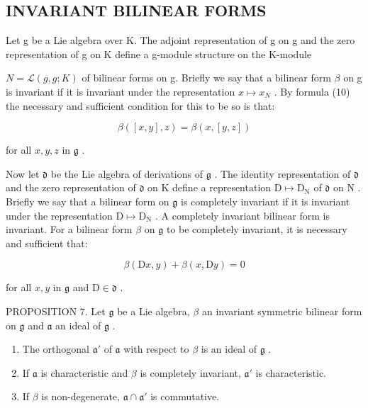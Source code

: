 \subsection{INVARIANT BILINEAR FORMS}

Let g be a Lie algebra over K. The adjoint representation of g on g and the zero representation of g on K define a g-module structure on the K-module

\(N = \mathcal{L}(g, g; K)\) of bilinear forms on g. Briefly we say that a bilinear form \(\beta\) on g is invariant if it is invariant under the representation \(x \mapsto x_{N}\) . By formula (10) the necessary and sufficient condition for this to be so is that:

\[
\beta ([ x, y ], z) = \beta (x, [ y, z ])\tag{13}
\]

for all \(x, y, z\) in \(\mathfrak{g}\) .

Now let \(\mathfrak{d}\) be the Lie algebra of derivations of \(\mathfrak{g}\) . The identity representation of \(\mathfrak{d}\) and the zero representation of \(\mathfrak{d}\) on \(\mathrm{K}\) define a representation \(\mathrm{D} \mapsto \mathrm{D}_{\mathrm{N}}\) of \(\mathfrak{d}\) on \(\mathrm{N}\) . Briefly we say that a bilinear form on \(\mathfrak{g}\) is completely invariant if it is invariant under the representation \(\mathrm{D} \mapsto \mathrm{D}_{\mathrm{N}}\) . A completely invariant bilinear form is invariant. For a bilinear form \(\beta\) on \(\mathfrak{g}\) to be completely invariant, it is necessary and sufficient that:

\[
\beta (\mathrm{D} x, y) + \beta (x, \mathrm{D} y) = 0\tag{14}
\]

for all \(x, y\) in \(\mathfrak{g}\) and \(\mathrm{D} \in \mathfrak{d}\) .

PROPOSITION 7. Let \(\mathfrak{g}\) be a Lie algebra, \(\beta\) an invariant symmetric bilinear form on \(\mathfrak{g}\) and \(\mathfrak{a}\) an ideal of \(\mathfrak{g}\) .

\begin{enumerate}
\def\labelenumi{(\alph{enumi})}
\item
  The orthogonal \(\mathfrak{a}'\) of \(\mathfrak{a}\) with respect to \(\beta\) is an ideal of \(\mathfrak{g}\) .
\item
  If \(\mathfrak{a}\) is characteristic and \(\beta\) is completely invariant, \(\mathfrak{a}'\) is characteristic.
\item
  If \(\beta\) is non-degenerate, \(\mathfrak{a} \cap \mathfrak{a}'\) is commutative.
\end{enumerate}


